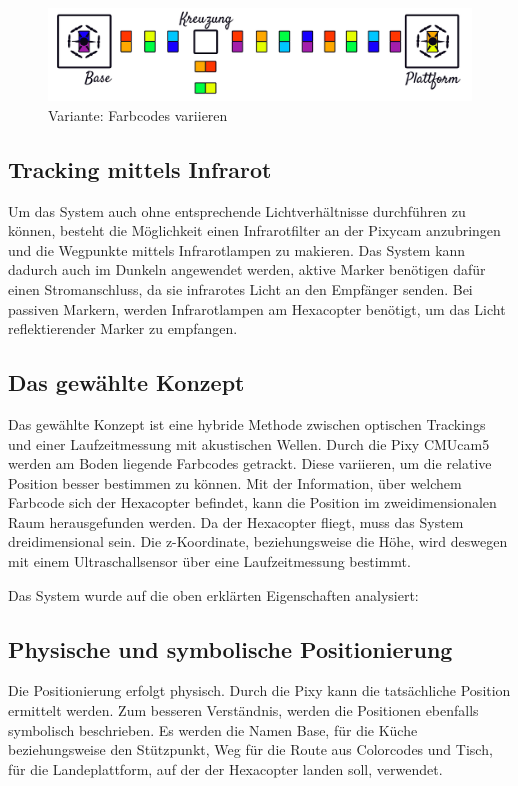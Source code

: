       \begin{figure}[H]
      \begin{centering}
        \includegraphics[width = \textwidth]{Bilder/bor_var2}
      \par\end{centering}
      \caption{Variante: Farbcodes variieren}
      \label{Variante2}
    \end{figure}

  \subsection*{Tracking mittels Infrarot}
  Um das System auch ohne entsprechende Lichtverhältnisse durchführen zu können, besteht die Möglichkeit einen Infrarotfilter an der Pixycam anzubringen und die Wegpunkte mittels Infrarotlampen zu makieren. Das System kann dadurch auch im Dunkeln angewendet werden, aktive Marker benötigen dafür einen Stromanschluss, da sie infrarotes Licht an den Empfänger senden. Bei passiven Markern, werden Infrarotlampen am Hexacopter benötigt, um das Licht reflektierender Marker zu empfangen.

  \subsection{Das gewählte Konzept}
  Das gewählte Konzept ist eine hybride Methode zwischen optischen Trackings und einer Laufzeitmessung mit akustischen Wellen.
  Durch die Pixy CMUcam5 werden am Boden liegende Farbcodes getrackt. Diese variieren, um die relative Position besser bestimmen zu können. Mit der Information, über welchem Farbcode sich der Hexacopter befindet, kann die Position im zweidimensionalen Raum herausgefunden werden. Da der Hexacopter fliegt, muss das System dreidimensional sein. Die z-Koordinate, beziehungsweise die Höhe, wird deswegen mit einem Ultraschallsensor über eine Laufzeitmessung bestimmt.

  Das System wurde auf die oben erklärten Eigenschaften analysiert:

  \subsection*{Physische und symbolische Positionierung}
  Die Positionierung erfolgt physisch. Durch die Pixy kann die tatsächliche Position ermittelt werden.
  Zum besseren Verständnis, werden die Positionen ebenfalls symbolisch beschrieben. Es werden die Namen Base, für die Küche beziehungsweise den Stützpunkt, Weg für die Route aus Colorcodes und Tisch, für die Landeplattform, auf der der Hexacopter landen soll, verwendet.

